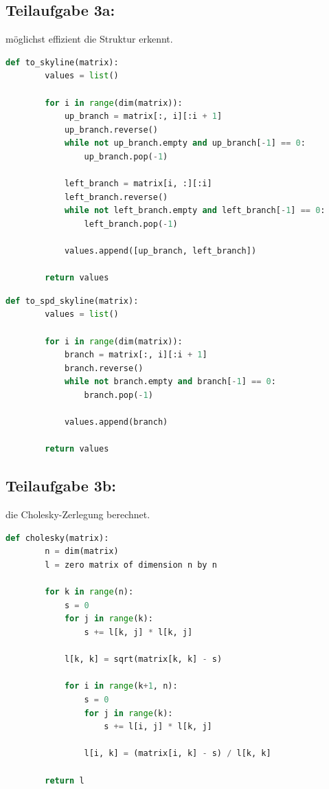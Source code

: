 \documentclass[]{article}
\begin{document}
\subsection{Teilaufgabe 3a:}
möglichst effizient die Struktur erkennt.

\begin{lstlisting}[language=Python, caption=Strukturerkennung einer Skyline-Matrix]
	def to_skyline(matrix):
		values = list()
		
		for i in range(dim(matrix)):
		    up_branch = matrix[:, i][:i + 1]
		    up_branch.reverse()
		    while not up_branch.empty and up_branch[-1] == 0:
		        up_branch.pop(-1)
		
		    left_branch = matrix[i, :][:i]
		    left_branch.reverse()
		    while not left_branch.empty and left_branch[-1] == 0:
		        left_branch.pop(-1)
		
		    values.append([up_branch, left_branch])
		    
		return values
\end{lstlisting}

\begin{lstlisting}[language=Python, caption=Strukturerkennung einer symmetrischen positiv definiten Skyline-Matrix]
	def to_spd_skyline(matrix):
	    values = list()
	
	    for i in range(dim(matrix)):
	        branch = matrix[:, i][:i + 1]
	        branch.reverse()
	        while not branch.empty and branch[-1] == 0:
	            branch.pop(-1)
	
	        values.append(branch)
	        
	    return values
\end{lstlisting}

\subsection*{Teilaufgabe 3b:}
die Cholesky-Zerlegung berechnet.

\begin{lstlisting}[language=Python, caption=Algorithmus für die Cholesky Zerlegung einer Matrix]
	def cholesky(matrix):	
	    n = dim(matrix)
	    l = zero matrix of dimension n by n
	
	    for k in range(n):
	        s = 0
	        for j in range(k):
	            s += l[k, j] * l[k, j]
	
	        l[k, k] = sqrt(matrix[k, k] - s)
	
	        for i in range(k+1, n):
	            s = 0
	            for j in range(k):
	                s += l[i, j] * l[k, j]
	                
	            l[i, k] = (matrix[i, k] - s) / l[k, k]
	
	    return l
\end{lstlisting}
\end{document}
